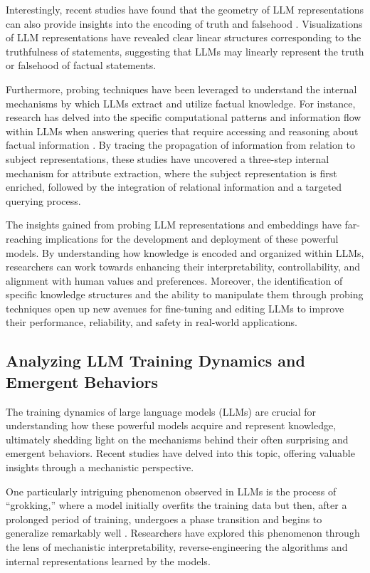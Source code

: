\documentclass[11pt]{article}
\begin{document}
Interestingly, recent studies have found that the geometry of LLM representations can also provide insights into the encoding of truth and falsehood \cite{ref251}. Visualizations of LLM representations have revealed clear linear structures corresponding to the truthfulness of statements, suggesting that LLMs may linearly represent the truth or falsehood of factual statements.

Furthermore, probing techniques have been leveraged to understand the internal mechanisms by which LLMs extract and utilize factual knowledge. For instance, research has delved into the specific computational patterns and information flow within LLMs when answering queries that require accessing and reasoning about factual information \cite{ref252}. By tracing the propagation of information from relation to subject representations, these studies have uncovered a three-step internal mechanism for attribute extraction, where the subject representation is first enriched, followed by the integration of relational information and a targeted querying process.

The insights gained from probing LLM representations and embeddings have far-reaching implications for the development and deployment of these powerful models. By understanding how knowledge is encoded and organized within LLMs, researchers can work towards enhancing their interpretability, controllability, and alignment with human values and preferences. Moreover, the identification of specific knowledge structures and the ability to manipulate them through probing techniques open up new avenues for fine-tuning and editing LLMs to improve their performance, reliability, and safety in real-world applications.

\subsection{Analyzing LLM Training Dynamics and Emergent Behaviors}

The training dynamics of large language models (LLMs) are crucial for understanding how these powerful models acquire and represent knowledge, ultimately shedding light on the mechanisms behind their often surprising and emergent behaviors. Recent studies have delved into this topic, offering valuable insights through a mechanistic perspective.

One particularly intriguing phenomenon observed in LLMs is the process of ``grokking,'' where a model initially overfits the training data but then, after a prolonged period of training, undergoes a phase transition and begins to generalize remarkably well \cite{ref237,ref253,ref254,ref255,ref256,ref257,ref258,ref259}. Researchers have explored this phenomenon through the lens of mechanistic interpretability, reverse-engineering the algorithms and internal representations learned by the models.
\end{document}
